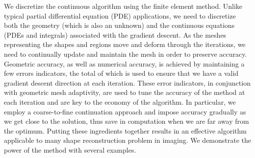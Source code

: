\documentclass{report}
\begin{document}
We discretize the continuous algorithm using the finite element method.
Unlike typical partial differential equation (PDE) applications, we need
to discretize both the geometry (which is also an unknown) and the
continuous equations (PDEs and integrals) associated with the gradient
descent. As the meshes representing the shapes and regions move and
deform through the iterations, we need to continually update and maintain
the mesh in order to preserve accuracy. Geometric accuracy, as well as
numerical accuracy, is achieved by maintaining a few errors indicators,
the total of which is used to ensure that we have a valid gradient
descent direction at each iteration. These error indicators, in
conjunction with geometric mesh adaptivity, are used to tune the accuracy
of the method at each iteration and are key to the economy of the
algorithm. In particular, we employ a coarse-to-fine continuation
approach and impose accuracy gradually as we get close to the solution,
thus save in computation when we are far away from the optimum. Putting
these ingredients together results in an effective algorithm applicable
to many shape reconstruction problem in imaging. We demonstrate the power
of the method with several examples.
\end{document}
